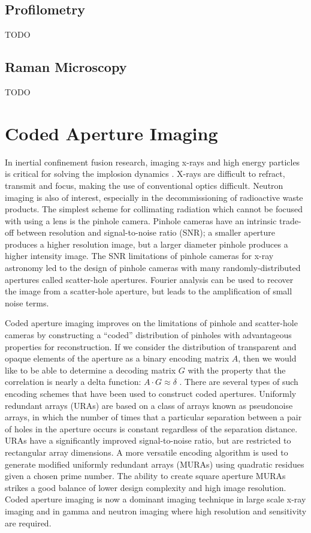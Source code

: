 \documentclass{jpp}
\begin{document}
\subsection{Profilometry}


{\Large TODO \par}

\subsection{Raman Microscopy}


{\Large TODO \par}


\section{Coded Aperture Imaging}

In inertial confinement fusion research, imaging x-rays and high energy particles is critical for solving the implosion dynamics \citep{Niki1983}. X-rays are difficult to refract, transmit and focus, making the use of conventional optics difficult. Neutron imaging is also of interest, especially in the decommissioning of radioactive waste products. The simplest scheme for collimating radiation which cannot be focused with using a lens is the pinhole camera. Pinhole cameras have an intrinsic trade-off between resolution and signal-to-noise ratio (SNR); a smaller aperture produces a higher resolution image, but a larger diameter pinhole produces a higher intensity image. The SNR limitations of pinhole cameras for x-ray astronomy led to the design of pinhole cameras with many randomly-distributed apertures called scatter-hole apertures. Fourier analysis can be used to recover the image from a scatter-hole aperture, but leads to the amplification of small noise terms.

Coded aperture imaging improves on the limitations of pinhole and scatter-hole cameras by constructing a ``coded'' distribution of pinholes with advantageous properties for reconstruction. If we consider the distribution of transparent and opaque elements of the aperture as a binary encoding matrix $A$, then we would like to be able to determine a decoding matrix $G$ with the property that the correlation is nearly a delta function: $A \cdot G \approx \delta$ \citep{CIESLAK201659}. There are several types of such encoding schemes that have been used to construct coded apertures. Uniformly redundant arrays (URAs) are based on a class of arrays known as pseudonoise arrays, in which the number of times that a particular separation between a pair of holes in the aperture occurs is constant regardless of the separation distance. URAs have a significantly improved signal-to-noise ratio, but are restricted to rectangular array dimensions. A more versatile encoding algorithm is used to generate modified uniformly redundant arrays (MURAs) using quadratic residues given a chosen prime number. The ability to create square aperture MURAs strikes a good balance of lower design complexity and high image resolution. Coded aperture imaging is now a dominant imaging technique in large scale x-ray imaging and in gamma and neutron imaging where high resolution and sensitivity are required.
\end{document}
